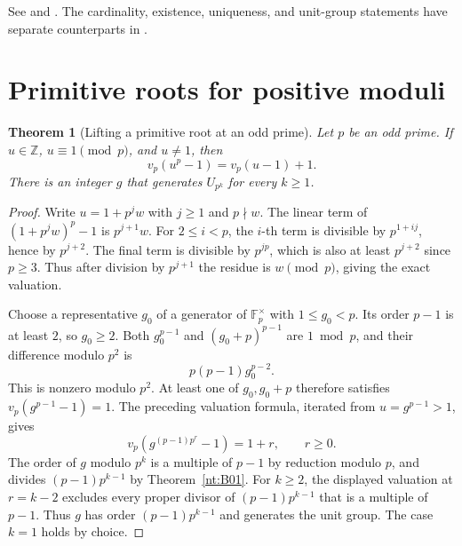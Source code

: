 \documentclass[11pt,oneside,openany]{book}
\theoremstyle{plain}
\newtheorem{theorem}{Theorem}[chapter]
\theoremstyle{definition}
\theoremstyle{remark}
\begin{document}
See \cite[Ch.~2]{lidl} and \cite[\S10.4]{apostol}.
The cardinality, existence, uniqueness, and unit-group
statements have separate counterparts in \cite[D07, Ch.~13]{mathgenome}.

\section{Primitive roots for positive moduli}

\begin{theorem}[Lifting a primitive root at an odd prime]\label{nt:B03}
Let $p$ be an odd prime. If $u\in\mathbb Z$, $u\equiv1\pmod p$,
and $u\ne1$, then
\[
 v_p(u^p-1)=v_p(u-1)+1.
\]
There is an integer $g$ that generates $U_{p^k}$ for every
$k\ge1$.
\end{theorem}
\begin{proof}
Write $u=1+p^j w$ with $j\ge1$ and $p\nmid w$. The linear term
of $(1+p^jw)^p-1$ is $p^{j+1}w$. For $2\le i<p$, the
$i$-th term is divisible by $p^{1+ij}$, hence by $p^{j+2}$.
The final term is divisible by $p^{jp}$, which is also at
least $p^{j+2}$ since $p\ge3$. Thus after division by $p^{j+1}$
the residue is $w\pmod p$, giving the exact valuation.

Choose a representative $g_0$ of a generator of
$\mathbb F_p^\times$ with $1\le g_0<p$. Its order $p-1$ is at
least $2$, so $g_0\ge2$. Both $g_0^{p-1}$ and
$(g_0+p)^{p-1}$ are $1\bmod p$, and their difference modulo
$p^2$ is
\[
  p(p-1)g_0^{p-2}.
\]
This is nonzero modulo $p^2$. At least one of $g_0,g_0+p$
therefore satisfies $v_p(g^{p-1}-1)=1$. The preceding valuation
formula, iterated from $u=g^{p-1}>1$, gives
\[
 v_p\!\left(g^{(p-1)p^r}-1\right)=1+r,\qquad r\ge0.
\]
The order of $g$ modulo $p^k$ is a multiple of $p-1$ by
reduction modulo $p$, and divides $(p-1)p^{k-1}$ by
Theorem~\ref{nt:B01}. For $k\ge2$, the displayed valuation
at $r=k-2$ excludes every proper divisor of $(p-1)p^{k-1}$
that is a multiple of $p-1$. Thus $g$ has order $(p-1)p^{k-1}$
and generates the unit group. The case $k=1$ holds by choice.
\end{proof}
\end{document}
